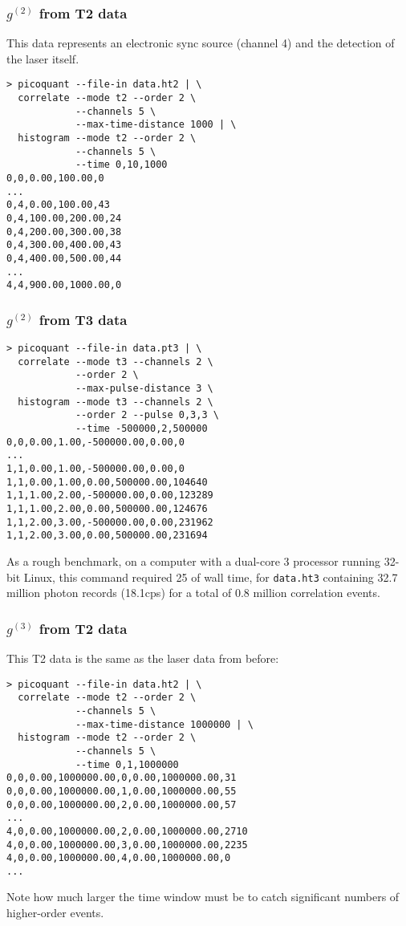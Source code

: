 \documentclass{article}
\newcommand{\cps}{\textnormal{cps}}
\newcommand{\gn}[1]{\ensuremath{g^{(#1)}}}
\begin{document}
\subsubsection{\gn{2} from T2 data}
This data represents an electronic sync source (channel 4) and the detection of the laser itself.
\begin{verbatim}
> picoquant --file-in data.ht2 | \
  correlate --mode t2 --order 2 \
            --channels 5 \
            --max-time-distance 1000 | \
  histogram --mode t2 --order 2 \
            --channels 5 \
            --time 0,10,1000
0,0,0.00,100.00,0
...
0,4,0.00,100.00,43
0,4,100.00,200.00,24
0,4,200.00,300.00,38
0,4,300.00,400.00,43
0,4,400.00,500.00,44
...
4,4,900.00,1000.00,0
\end{verbatim}

\subsubsection{\gn{2} from T3 data}
\begin{verbatim}
> picoquant --file-in data.pt3 | \
  correlate --mode t3 --channels 2 \
            --order 2 \
            --max-pulse-distance 3 \
  histogram --mode t3 --channels 2 \
            --order 2 --pulse 0,3,3 \
            --time -500000,2,500000
0,0,0.00,1.00,-500000.00,0.00,0
...
1,1,0.00,1.00,-500000.00,0.00,0
1,1,0.00,1.00,0.00,500000.00,104640
1,1,1.00,2.00,-500000.00,0.00,123289
1,1,1.00,2.00,0.00,500000.00,124676
1,1,2.00,3.00,-500000.00,0.00,231962
1,1,2.00,3.00,0.00,500000.00,231694
\end{verbatim}
As a rough benchmark, on a computer with a dual-core 3\giga\hertz{} processor running 32-bit Linux, this command required 25\second{} of wall time, for \texttt{data.ht3} containing 32.7 million photon records (18.1\kilo\cps) for a total of 0.8 million correlation events.

\subsubsection{\gn{3} from T2 data}
This T2 data is the same as the laser data from before:
\begin{verbatim}
> picoquant --file-in data.ht2 | \
  correlate --mode t2 --order 2 \
            --channels 5 \
            --max-time-distance 1000000 | \
  histogram --mode t2 --order 2 \
            --channels 5 \
            --time 0,1,1000000
0,0,0.00,1000000.00,0,0.00,1000000.00,31
0,0,0.00,1000000.00,1,0.00,1000000.00,55
0,0,0.00,1000000.00,2,0.00,1000000.00,57
...
4,0,0.00,1000000.00,2,0.00,1000000.00,2710
4,0,0.00,1000000.00,3,0.00,1000000.00,2235
4,0,0.00,1000000.00,4,0.00,1000000.00,0
...
\end{verbatim}
Note how much larger the time window must be to catch significant numbers of higher-order events.
\end{document}
